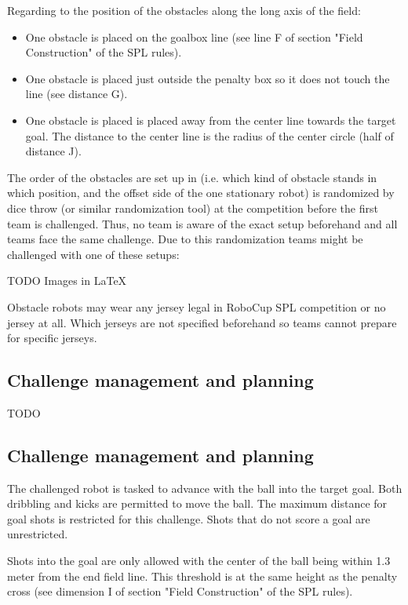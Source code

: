 Regarding to the position of the obstacles along the long axis of the field:

\begin{itemize}
  \item One obstacle is placed on the goalbox line (see line F of section "Field Construction" of the SPL rules).
  \item One obstacle is placed just outside the penalty box so it does not touch the line (see distance  G).
  \item One obstacle is placed is placed away from the center line towards the target goal. The distance to the center line is the radius of the center circle (half of distance J).
\end{itemize}

The order of the obstacles are set up in (i.e. which kind of obstacle stands in which position, and the offset side of the one stationary robot) is randomized by dice throw (or similar randomization tool) at the competition before the first team is challenged. Thus, no team is aware of the exact setup beforehand and all teams face the same challenge. Due to this randomization teams might be challenged with one of these setups:

TODO Images in \LaTeX

Obstacle robots may wear any jersey legal in RoboCup SPL competition or no jersey at all. Which jerseys are not specified beforehand so teams cannot prepare for specific jerseys.

\subsection{Challenge management and planning}

TODO

\subsection{Challenge management and planning}

The challenged robot is tasked to advance with the ball into the target goal. Both dribbling and kicks are permitted to move the ball. The maximum distance for goal shots is restricted for this challenge. Shots that do not score a goal are unrestricted.

Shots into the goal are only allowed with the center of the ball being within 1.3 meter from the end field line. This threshold is at the same height as the penalty cross (see dimension I of section "Field Construction" of the SPL rules).

